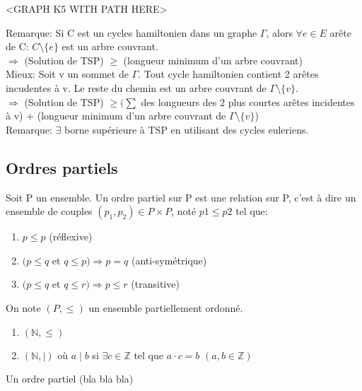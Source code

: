 \begin{exmp}
<GRAPH K5 WITH PATH HERE>\\
\end{exmp}

Remarque: Si C est un cycles hamiltonien dans un graphe $\Gamma$, alors $\forall e \in E$ arête de C: $ C \setminus\{e\}$ est un arbre couvrant.\\

$\Rightarrow$ (Solution de TSP) $\geq$ (longueur minimum d'un arbre couvrant)\\

Mieux: Soit v un sommet de $\Gamma$. Tout cycle hamiltonien contient 2 arêtes incudentes à v. Le reste du chemin est un arbre couvrant de $\Gamma \setminus\{v\}$.\\

$\Rightarrow$ (Solution de TSP) $\geq (\sum$ des longueurs des 2 plus courtes arêtes incidentes à v) + (longueur minimum d'un arbre couvrant de $\Gamma \setminus\{v\}$)\\

Remarque: $\exists$ borne supérieure à TSP en utilisant des cycles euleriens. \\


\subsection{Ordres partiels}

\begin{defn}
Soit P un ensemble. Un ordre partiel sur P est une relation sur P, c'est à dire un ensemble de couples $(p_{1},p_{2}) \in P\times P$, noté $p{1} \leq p{2}$ tel que:
	\begin{enumerate}
		\item $p \leq p$ (réflexive)
		\item $(p \leq q$ et $q \leq p ) \Rightarrow p = q$ (anti-symétrique)
		\item $(p \leq q$ et $q \leq r ) \Rightarrow p \leq r$ (transitive)\\
	\end{enumerate}
On note $(P,\leq)$ un ensemble partiellement ordonné.\\
\end{defn}

\begin{exmp}
	\begin{enumerate}
		\item $(\mathbb{N},\leq)$
		\item $(\mathbb{N},\mid)$ où $a \mid b$ si $\exists c \in \mathbb{Z}$ tel que $a \cdot c = b$ $(a,b \in \mathbb{Z})$\\
	\end{enumerate}
\end{exmp}


Un ordre partiel (bla bla bla) \\




